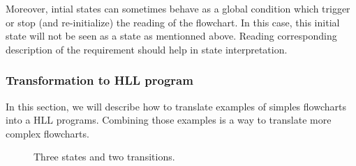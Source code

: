 Moreover, intial states can sometimes behave as a global condition
which trigger or stop (and re-initialize) the reading of the
flowchart. In this case, this initial state will not be seen as a
state as mentionned above. Reading corresponding description of the
requirement should help in state interpretation.


\subsubsection{Transformation to HLL program}
\label{transformation-to-hll-program}
In this section, we will describe how to translate examples of simples
flowcharts into a HLL programs. Combining those examples is a way to
translate more complex flowcharts. 

\begin{figure}[h]
\centering
{}
\caption{Three states and two transitions.}
\label{example-1}
\end{figure}


